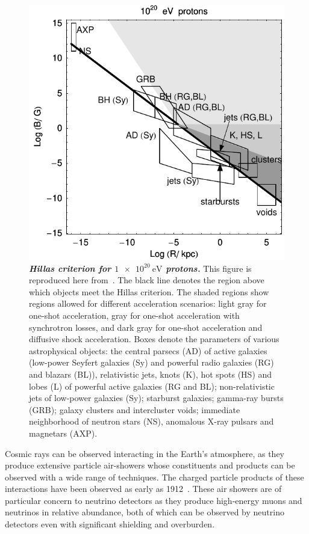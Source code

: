\begin{figure}
	\centering
	\includegraphics[width=\linewidth]{figures/HillasCriterionProton20}
	\internallinenumbers
	\caption{\textbf{\textit{Hillas criterion for $\SI{1e20}\eV$ protons.}}
		This figure is reproduced here from~\cite{Ptitsyna:2008zs}.
		The black line denotes the region above which objects meet the Hillas criterion.
		The shaded regions show regions allowed for different acceleration scenarios: light gray for one-shot acceleration, gray for one-shot acceleration with synchrotron losses, and dark gray for one-shot acceleration and diffusive shock acceleration.
		Boxes denote the parameters of various astrophysical objects: the central
		parsecs (AD) of active galaxies (low-power Seyfert galaxies (Sy) and powerful radio galaxies (RG) and blazars (BL)), relativistic jets, knots (K), hot spots (HS) and lobes (L) of powerful active galaxies (RG and BL); non-relativistic jets of low-power galaxies (Sy); starburst	galaxies; gamma-ray bursts (GRB); galaxy clusters and intercluster voids; immediate
		neighborhood of neutron stars (NS), anomalous X-ray pulsars and magnetars (AXP).
	}\label{fig:hillasp20}
\end{figure}

Cosmic rays can be observed interacting in the Earth's atmosphere, as they produce extensive particle air-showers whose constituents and products can be observed with a wide range of techniques.
The charged particle products of these interactions have been observed as early as 1912~\cite{hess1912uber}.
These air showers are of particular concern to neutrino detectors as they produce high-energy muons and neutrinos in relative abundance, both of which can be observed by neutrino detectors even with significant shielding and overburden.

